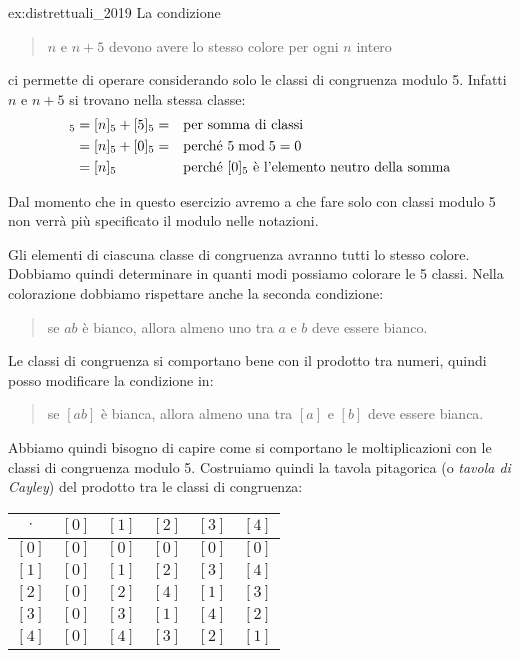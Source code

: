 \begin{soluzione}{ex:distrettuali_2019}
    La condizione
    \begin{quotation}
        $n$ e $n + 5$ devono avere lo stesso colore per ogni $n$ intero
    \end{quotation}
    ci permette di operare considerando solo le classi di congruenza modulo 5.
    Infatti $n$ e $n + 5$ si trovano nella stessa classe:
    \begin{align*}
        [n + 5]_5 &= [n]_5 + [5]_5 = && \text{per somma di classi} \\
        &= [n]_5 + [0]_5 = && \text{perché $5 \modulo 5 = 0$} \\
        &= [n]_5 && \text{perché $[0]_5$ è l'elemento neutro della somma}
    \end{align*}

    Dal momento che in questo esercizio avremo a che fare solo con classi modulo 5 non verrà più specificato il modulo
    nelle notazioni.

    Gli elementi di ciascuna classe di congruenza avranno tutti lo stesso colore.
    Dobbiamo quindi determinare in quanti modi possiamo colorare le 5 classi.
    Nella colorazione dobbiamo rispettare anche la seconda condizione:
    \begin{quotation}
        se $ab$ è bianco, allora almeno uno tra $a$ e $b$ deve essere bianco.
    \end{quotation}

    Le classi di congruenza si comportano bene con il prodotto tra numeri, quindi posso modificare la condizione in:
    \begin{quotation}
        se $[ab]$ è bianca, allora almeno una tra $[a]$ e $[b]$ deve essere bianca.
    \end{quotation}

    Abbiamo quindi bisogno di capire come si comportano le moltiplicazioni con le classi di congruenza modulo 5.
    Costruiamo quindi la tavola pitagorica (o \emph{tavola di Cayley}) del prodotto tra le classi di congruenza:

    \begin{table}[H]
        \label{tab:distrettuali_2019}
        \centering
        \begin{tabular}{c|ccccc}
            $\cdot$ & $[0]$ & $[1]$ & $[2]$ & $[3]$ & $[4]$ \\
            \midrule
            $[0]$ & $[0]$ & $[0]$ & $[0]$ & $[0]$ & $[0]$ \\
            $[1]$ & $[0]$ & $[1]$ & $[2]$ & $[3]$ & $[4]$ \\
            $[2]$ & $[0]$ & $[2]$ & $[4]$ & $[1]$ & $[3]$ \\
            $[3]$ & $[0]$ & $[3]$ & $[1]$ & $[4]$ & $[2]$ \\
            $[4]$ & $[0]$ & $[4]$ & $[3]$ & $[2]$ & $[1]$
        \end{tabular}
    \end{table}


\end{soluzione}
